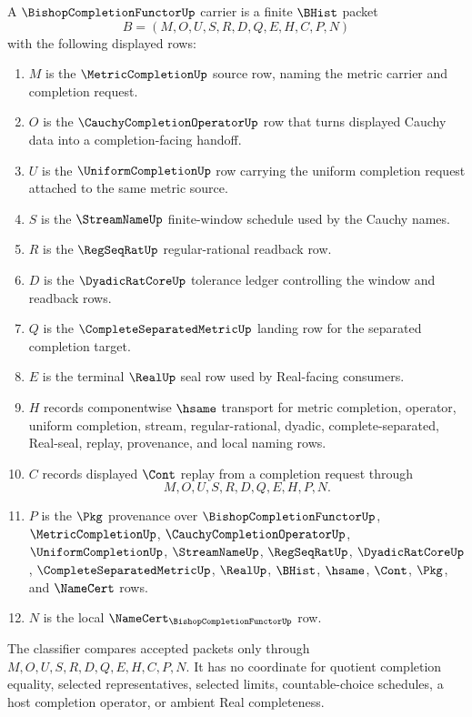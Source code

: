 \begin{definition}
\label{def:bishop-completion-functor-carrier}
A $\BishopCompletionFunctorUp$ carrier is a finite $\BHist$ packet
$$
B=(M,O,U,S,R,D,Q,E,H,C,P,N)
$$
with the following displayed rows:
\begin{enumerate}
\item $M$ is the $\MetricCompletionUp$ source row, naming the metric carrier and completion request.
\item $O$ is the $\CauchyCompletionOperatorUp$ row that turns displayed Cauchy data into a completion-facing handoff.
\item $U$ is the $\UniformCompletionUp$ row carrying the uniform completion request attached to the same metric source.
\item $S$ is the $\StreamNameUp$ finite-window schedule used by the Cauchy names.
\item $R$ is the $\RegSeqRatUp$ regular-rational readback row.
\item $D$ is the $\DyadicRatCoreUp$ tolerance ledger controlling the window and readback rows.
\item $Q$ is the $\CompleteSeparatedMetricUp$ landing row for the separated completion target.
\item $E$ is the terminal $\RealUp$ seal row used by Real-facing consumers.
\item $H$ records componentwise $\hsame$ transport for metric completion, operator, uniform completion, stream, regular-rational, dyadic, complete-separated, Real-seal, replay, provenance, and local naming rows.
\item $C$ records displayed $\Cont$ replay from a completion request through
$$
M,O,U,S,R,D,Q,E,H,P,N .
$$
\item $P$ is the $\Pkg$ provenance over $\BishopCompletionFunctorUp$, $\MetricCompletionUp$, $\CauchyCompletionOperatorUp$, $\UniformCompletionUp$, $\StreamNameUp$, $\RegSeqRatUp$, $\DyadicRatCoreUp$, $\CompleteSeparatedMetricUp$, $\RealUp$, $\BHist$, $\hsame$, $\Cont$, $\Pkg$, and $\NameCert$ rows.
\item $N$ is the local $\NameCert_{\BishopCompletionFunctorUp}$ row.
\end{enumerate}
The classifier compares accepted packets only through $M,O,U,S,R,D,Q,E,H,C,P,N$. It has no coordinate for quotient completion equality, selected representatives, selected limits, countable-choice schedules, a host completion operator, or ambient Real completeness.
\end{definition}

